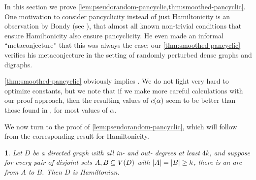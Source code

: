 \documentclass[11pt,english]{article}
\theoremstyle{plain}
\theoremstyle{definition}
\theoremstyle{definition}
\theoremstyle{plain}
\theoremstyle{plain}
\theoremstyle{plain}
\newtheorem{lem}[thm]{\protect\lemmaname}
\theoremstyle{plain}
\theoremstyle{remark}
\theoremstyle{remark}
\let\originalleft\left
\let\originalright\right
\renewcommand{\left}{\mathopen{}\mathclose\bgroup\originalleft}
\renewcommand{\right}{\aftergroup\egroup\originalright}
\providecommand{\lemmaname}{Lemma}
\begin{document}
In this section we prove \ref{lem:pseudorandom-pancyclic,thm:smoothed-pancyclic}. One motivation to consider pancyclicity instead of just Hamiltonicity is an observation by Bondy (see \cite{Bon75}),
that almost all known non-trivial conditions that ensure Hamiltonicity
also ensure pancyclicity. He even made an informal ``metaconjecture''
that this was always the case; our \ref{thm:smoothed-pancyclic} verifies
his metaconjecture in the setting of randomly perturbed dense graphs
and digraphs.

\ref{thm:smoothed-pancyclic} obviously implies \cite[Theorems~1 and~3]{BFM03}.
We do not fight very hard to optimize constants, but we note that if we make more careful calculations with our proof approach, then the resulting values of $\cdi\left(\alpha\right)$ seem to be better
than those found in \cite{BFM03}, for most values of $\alpha$.

We now turn to the proof of \ref{lem:pseudorandom-pancyclic}, which
will follow from the corresponding result for Hamiltonicity.
\begin{lem}
\label{lem:pseudorandom-hamiltonian}Let $D$ be a directed graph
with all in- and out- degrees at least $4k$, and suppose for every pair of
disjoint sets $A,B\subseteq V\left(D\right)$ with $\left|A\right|=\left|B\right|\ge k$,
there is an arc from $A$ to $B$. Then $D$ is Hamiltonian.\end{lem}
\end{document}
